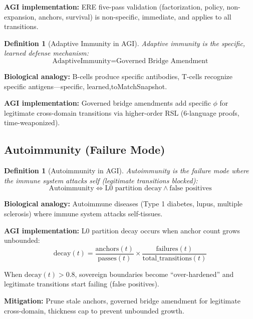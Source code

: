 \documentclass[11pt,a4paper]{article}
\newtheorem{definition}[theorem]{Definition}
\begin{document}
\textbf{AGI implementation:} ERE five-pass validation (factorization, policy, non-expansion, anchors, survival) is non-specific, immediate, and applies to all transitions.

\begin{definition}[Adaptive Immunity in AGI]
Adaptive immunity is the specific, learned defense mechanism:
\begin{equation}
\text{AdaptiveImmunity} = \text{Governed Bridge Amendment}
\end{equation}
\end{definition}

\textbf{Biological analogy:} B-cells produce specific antibodies, T-cells recognize specific antigens—specific, learned,toMatchSnapshot.

\textbf{AGI implementation:} Governed bridge amendments add specific $\phi$ for legitimate cross-domain transitions via higher-order RSL (6-language proofs, time-weaponized).

\subsection{Autoimmunity (Failure Mode)}

\begin{definition}[Autoimmunity in AGI]
Autoimmunity is the failure mode where the immune system attacks self (legitimate transitions blocked):
\begin{equation}
\text{Autoimmunity} \iff \text{L0 partition decay} \land \text{false positives}
\end{equation}
\end{definition}

\textbf{Biological analogy:} Autoimmune diseases (Type 1 diabetes, lupus, multiple sclerosis) where immune system attacks self-tissues.

\textbf{AGI implementation:} L0 partition decay occurs when anchor count grows unbounded:
\begin{equation}
\text{decay}(t) = \frac{\text{anchors}(t)}{\text{passes}(t)} \times \frac{\text{failures}(t)}{\text{total\_transitions}(t)}
\end{equation}

When $\text{decay}(t) > 0.8$, sovereign boundaries become ``over-hardened'' and legitimate transitions start failing (false positives).

\textbf{Mitigation:} Prune stale anchors, governed bridge amendment for legitimate cross-domain, thickness cap to prevent unbounded growth.
\end{document}
